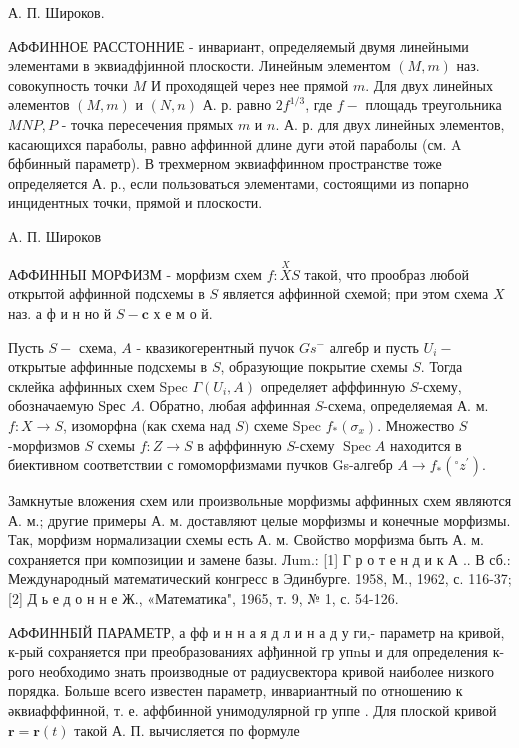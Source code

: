 \documentclass[10pt]{article}
\begin{document}
А. П. Широков.



АФФИННОЕ РАССТОННИЕ - инвариант, определяемый двумя линейными элементами в эквиадфјинной плоскости. Линейным элементом $(M, m)$ наз. совокупность точки $M$ И проходящей через нее прямой $m$. Для двух линейных әлементов $(M, m)$ и $(N, n)$ А. р. равно $2 f^{1 / 3}$, где $f-$ площадь треугольника $M N P, P$ - точка пересечения прямых $m$ и $n$. А. р. для двух линейных элементов, касающихся параболы, равно аффинной длине дуги әтой параболы (см. A бфбинный параметр). В трехмерном эквиаффинном пространстве тоже определяется А. р., если пользоваться элементами, состоящими из попарно инцидентных точки, прямой и плоскости.



A. П. Широков



АФФИННЫІ МОРФИЗМ - морфизм схем $f: \stackrel{X}{X} S$ такой, что прообраз любой открытой аффинной подсхемы в $S$ является аффинной схемой; при этом схема $X$ наз. а ф и н но й $S-\mathbf{c}$ х е м о й.



Пусть $S-$ схема, $A$ - квазикогерентный пучок $G s^{-}$ алгебр и пусть $U_{i}-$ открытые аффинные подсхемы в $S$, образующие покрытие схемы $S$. Тогда склейка аффинных схем Spec $\Gamma\left(U_{i}, A\right)$ определяет афффинную $S$-схему, обозначаемую Sрес $A$. Обратно, любая аффинная $S$-схема, определяемая А. м. $f: X \rightarrow S$, изоморфна (как схема над $S)$ схеме Spec $f_{*}\left(\sigma_{x}\right)$. Множество $S$-морфизмов $S$ схемы $f: Z \rightarrow S$ в афффинную $S$-схему $\operatorname{Spec} A$ находится в биективном соответствии с гомоморфизмами пучков Gs-алгебр $A \rightarrow f_{*}\left({ }^{\circ} z^{\prime}\right)$.



Замкнутые вложения схем или произвольные морфизмы аффинных схем являются А. м.; другие примеры А. м. доставляют целые морфизмы и конечные морфизмы. Так, морфизм нормализации схемы есть А. м. Свойство морфизма быть А. м. сохраняется при композиции и замене базы. Лum.: [1] Г р о т е н д и к А .. В сб.: Международный математический конгресс в Эдинбурге. 1958, М., 1962, с. 116-37; [2] Д ь е д о н н е Ж., «Математика", 1965, т. 9, № 1, с. 54-126.



АФФИННБІЙ ПАРАМЕТР, а фф и н н а я д л и н а д у ги,- параметр на кривой, к-рый сохраняется при преобразованиях афђинной гр упnы и для определения к-рого необходимо знать производные от радиусвектора кривой наиболее низкого порядка. Больше всего известен параметр, инвариантный по отношению к әквиафффинной, т. е. аффбинной унимодулярной гр уппе . Для плоской кривой $\boldsymbol{r}=\boldsymbol{r}(t)$ такой А. П. вычисляется по формуле
\end{document}
